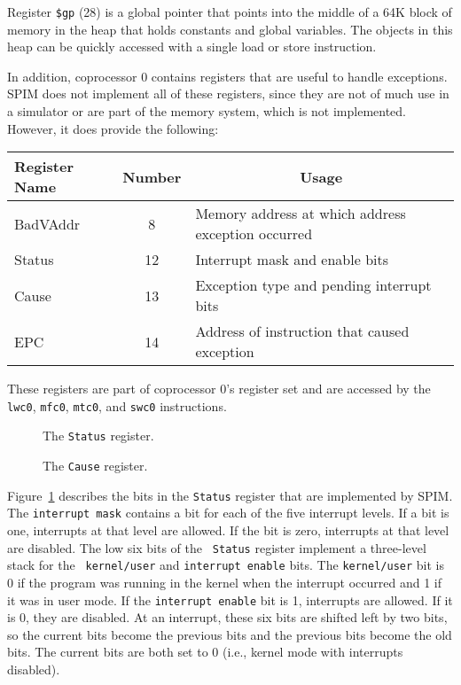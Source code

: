 Register {\tt \$gp} (28) is a global pointer that points into the
middle of a 64K block of memory in the heap that holds constants and
global variables.  The objects in this heap can be quickly accessed
with a single load or store instruction.

In addition, coprocessor 0 contains registers that are useful to
handle exceptions.  SPIM does not implement all of these registers,
since they are not of much use in a simulator or are part of the
memory system, which is not implemented.  However, it does provide the
following:
\begin{center}
  \small
  \begin{tabular}{|l|c|l|}
    \hline
    {\bf Register Name} & {\bf Number} & \multicolumn{1}{|c|}{\bf Usage} \\
    \hline
    \hline
    BadVAddr & 8 & Memory address at which address exception occurred \\
    Status & 12 & Interrupt mask and enable bits \\
    Cause & 13 & Exception type and pending interrupt bits \\
    EPC & 14 & Address of instruction that caused exception \\
    \hline
  \end{tabular}
\end{center}
These registers are part of coprocessor 0's register set and are
accessed by the {\tt lwc0}, {\tt mfc0}, {\tt mtc0}, and {\tt swc0}
instructions.

\begin{figure}
  \centerline{}
  \caption{The {\tt Status} register.}
  \label{fig:status_reg}
\end{figure}
\begin{figure}
  \centerline{}
  \caption{The {\tt Cause} register.}
  \label{fig:cause_reg}
\end{figure}
Figure~\ref{fig:status_reg} describes the bits in the {\tt Status}
register that are implemented by SPIM.  The {\tt interrupt mask}
contains a bit for each of the five interrupt levels.  If a bit is
one, interrupts at that level are allowed.  If the bit is zero,
interrupts at that level are disabled.  The low six bits of the {\tt
Status} register implement a three-level stack for the {\tt
kernel/user} and {\tt interrupt enable} bits.  The {\tt kernel/user}
bit is 0 if the program was running in the kernel when the interrupt
occurred and 1 if it was in user mode. If the {\tt interrupt enable}
bit is 1, interrupts are allowed.  If it is 0, they are disabled. At an
interrupt, these six bits are shifted left by two bits, so the current
bits become the previous bits and the previous bits become the old
bits.  The current bits are both set to 0 (i.e., kernel mode with
interrupts disabled).

